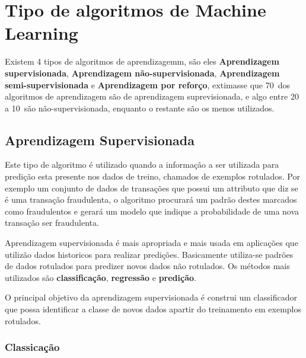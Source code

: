 \section{Tipo de algoritmos de Machine Learning}
\label{sec:ml-types}

Existem 4 tipos de algoritmos de aprendizagemm, são eles \textbf{Aprendizagem supervisionada}, \textbf{Aprendizagem não-supervisionada},
\textbf{Aprendizagem semi-supervisionada} e \textbf{Aprendizagem por reforço}, extimasse que 70\ dos algoritmos de aprendizagem são de 
aprendizagem suprevisionada, e algo entre 20 a 10\ são não-supervisionada, enquanto o restante são os menos utilizados.

\subsection{Aprendizagem Supervisionada}
\label{subsec:supervised-learning}
Este tipo de algoritmo é utilizado quando a informação a ser utilizada para predição esta presente nos dados de treino, chamados de 
exemplos rotulados. Por exemplo um conjunto de dados de transações que possui um attributo que diz se é uma transação fraudulenta, o 
algoritmo procurará um padrão destes marcados como fraudulentos e gerará um modelo que indique a probabilidade de uma nova transação 
ser fraudulenta.

Aprendizagem supervisionada é mais apropriada e mais usada em aplicações que utilizão dados historicos para realizar predições. 
Basicamente utiliza-se padrões de dados rotulados para predizer novos dados não rotulados. 
Os métodos mais utilizados são \textbf{classificação}, \textbf{regressão} e \textbf{predição}.

O principal objetivo da aprendizagem supervisionada é construi um classificador que possa identificar a classe de novos dados apartir
do treinamento em exemplos rotulados.     


\subsubsection{Classicação}
\label{subsubsec:classificacao}

